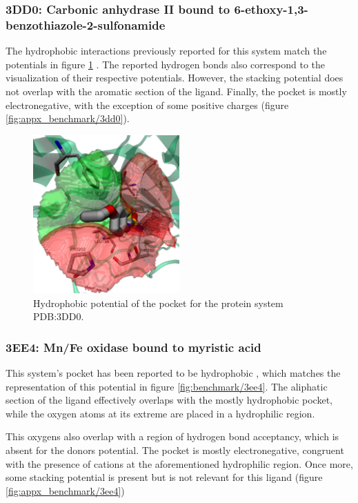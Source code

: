     \subsubsection{3DD0: Carbonic anhydrase II bound to 6-ethoxy-1,3-benzothiazole-2-sulfonamide}
      The hydrophobic interactions previously reported for this system match the potentials in figure \ref{fig:benchmark/3dd0} \cite{benchmark_strong_2021}. The reported hydrogen bonds also correspond to the visualization of their respective potentials. However, the stacking potential does not overlap with the aromatic section of the ligand. Finally, the pocket is mostly electronegative, with the exception of some positive charges (figure \ref{fig:appx_benchmark/3dd0}).

      \begin{figure}[H]
        \centering
        \includegraphics[width=0.5\textwidth]{figures/results/benchmark_prot/3dd0.png}
        \caption{\label{fig:benchmark/3dd0} Hydrophobic potential of the pocket for the protein system PDB:3DD0.}
      \end{figure}

    \subsubsection{3EE4: Mn/Fe oxidase bound to myristic acid}
      This system's pocket has been reported to be hydrophobic \cite{benchmark_hydrophobic_2009}, which matches the representation of this potential in figure \ref{fig:benchmark/3ee4}. The aliphatic section of the ligand effectively overlaps with the mostly hydrophobic pocket, while the oxygen atoms at its extreme are placed in a hydrophilic region.

      This oxygens also overlap with a region of hydrogen bond acceptancy, which is absent for the donors potential. The pocket is mostly electronegative, congruent with the presence of cations at the aforementioned hydrophilic region. Once more, some stacking potential is present but is not relevant for this ligand (figure \ref{fig:appx_benchmark/3ee4})

